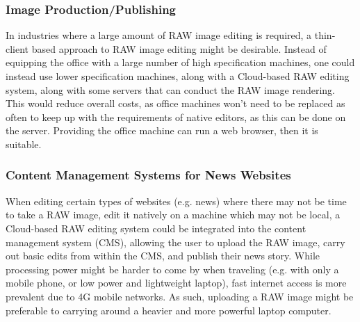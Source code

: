 \documentclass[10pt,a4paper]{article}
\begin{document}

\subsubsection{Image Production/Publishing}
In industries where a large amount of RAW image editing is required, a thin-client based approach to RAW image editing might be desirable.
Instead of equipping the office with a large number of high specification machines, one could instead use lower specification machines,
along with a Cloud-based RAW editing system, along with some servers that can conduct the RAW image rendering. This would reduce overall costs,
as office machines won't need to be replaced as often to keep up with the requirements of native editors, as this can be done on the server. 
Providing the office machine can run a web browser, then it is suitable.

\subsubsection{Content Management Systems for News Websites}
When editing certain types of websites (e.g. news) where there may not be time to take a RAW image, edit it natively on a machine
which may not be local, a Cloud-based RAW editing system could be integrated into the content management system (CMS), allowing the user
to upload the RAW image, carry out basic edits from within the CMS, and publish their news story. While processing power might be harder to
come by when traveling (e.g. with only a mobile phone, or low power and lightweight laptop), fast internet access is more prevalent due to
4G mobile networks. As such, uploading a RAW image might be preferable to carrying around a heavier and more powerful laptop computer.
\end{document}

